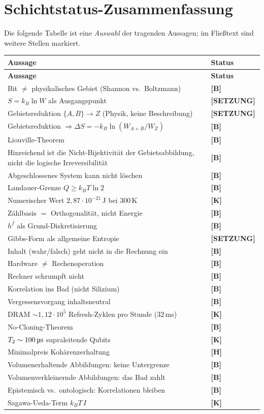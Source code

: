 \documentclass[11pt,a4paper]{article}
\newcommand{\LS}{\textcolor{laySet}{\textbf{\footnotesize\textsf{[SETZUNG]}}}\,}
\newcommand{\LK}{\textcolor{layK}{\textbf{\footnotesize\textsf{[K]}}}\,}
\newcommand{\LB}{\textcolor{layB}{\textbf{\footnotesize\textsf{[B]}}}\,}
\newcommand{\LH}{\textcolor{layH}{\textbf{\footnotesize\textsf{[H]}}}\,}
\begin{document}
\section{Schichtstatus-Zusammenfassung}

Die folgende Tabelle ist eine \emph{Auswahl} der tragenden Aussagen; im Fließtext
sind weitere Stellen markiert.

\begin{center}
\small
\begin{longtable}{@{}p{}l@{}}
\toprule
\textbf{Aussage} & \textbf{Status} \\
\midrule
\endfirsthead
\toprule
\textbf{Aussage} & \textbf{Status} \\
\midrule
\endhead
Bit $\ne$ physikalisches Gebiet (Shannon vs.\ Boltzmann) & \LB \\
$S = k_B \ln W$ als Ausgangspunkt & \LS \\
Gebietsreduktion $\{A,B\}\to Z$ (Physik, keine Beschreibung) & \LS \\
Gebietsreduktion $\Rightarrow \Delta S = -k_B \ln(W_{A+B}/W_Z)$ & \LB \\
Liouville-Theorem & \LB \\
Hinreichend ist die Nicht-Bijektivität der Gebietsabbildung, nicht die logische Irreversibilität & \LB \\
Abgeschlossenes System kann nicht löschen & \LB \\
Landauer-Grenze $Q \ge k_B T \ln 2$ & \LB \\
Numerischer Wert $2{,}87\cdot10^{-21}$\,J bei 300\,K & \LK \\
Zählbasis $=$ Orthogonalität, nicht Energie & \LB \\
$h^f$ als Grund-Diskretisierung & \LB \\
Gibbs-Form als allgemeine Entropie & \LS \\
Inhalt (wahr/falsch) geht nicht in die Rechnung ein & \LB \\
Hardware $\ne$ Rechenoperation & \LB \\
Rechner schrumpft nicht & \LB \\
Korrelation ins Bad (nicht Silizium) & \LB \\
Vergessensvorgang inhaltsneutral & \LB \\
DRAM ${\sim}1{,}12\cdot10^{5}$ Refresh-Zyklen pro Stunde (32\,ms) & \LK \\
No-Cloning-Theorem & \LB \\
$T_2 \sim 100\,\text{\textmu s}$ supraleitende Qubits & \LK \\
Minimalpreis Kohärenzerhaltung & \LH \\
Volumenerhaltende Abbildungen: keine Untergrenze & \LB \\
Volumenverkleinernde Abbildungen: das Bad zahlt & \LB \\
Epistemisch vs.\ ontologisch: Korrelationen bleiben & \LB \\
Sagawa-Ueda-Term $k_B T\,I$ & \LK \\
\bottomrule
\end{longtable}
\end{center}
\end{document}
